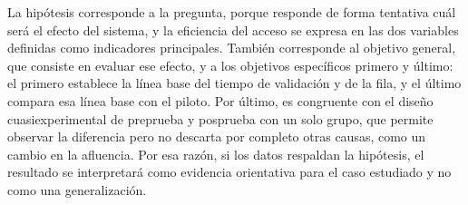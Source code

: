 La hipótesis corresponde a la pregunta, porque responde de forma tentativa
cuál será el efecto del sistema, y la eficiencia del acceso se expresa en las
dos variables definidas como indicadores principales. También
corresponde al objetivo general, que consiste en evaluar ese efecto, y a los
objetivos específicos primero y último: el primero establece la línea base
del tiempo de validación y de la fila, y el último compara esa línea base con
el piloto. Por último, es congruente con el diseño cuasiexperimental de
preprueba y posprueba con un solo grupo, que permite observar la diferencia
pero no descarta por completo otras causas, como un cambio en la afluencia.
Por esa razón, si los datos respaldan la hipótesis, el resultado se
interpretará como evidencia orientativa para el caso estudiado y no como una
generalización.
